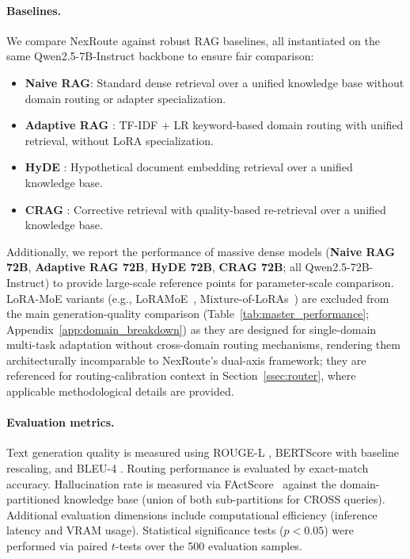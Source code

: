 \documentclass[a4paper,fleql]{cas-sc}
\begin{document}
\paragraph{Baselines.}
We compare NexRoute against robust RAG baselines, all instantiated on the same
Qwen2.5-7B-Instruct backbone to ensure fair comparison:
\begin{itemize}
    \item \textbf{Naive RAG}: Standard dense retrieval over a unified knowledge
    base without domain routing or adapter specialization.

    \item \textbf{Adaptive RAG} \citep{jeong2024adaptiverag}: TF-IDF + LR
    keyword-based domain routing with unified retrieval, without LoRA
    specialization.

    \item \textbf{HyDE} \citep{gao2023hyde}: Hypothetical document embedding
    retrieval over a unified knowledge base.

    \item \textbf{CRAG} \citep{yan2024crag}: Corrective retrieval with
    quality-based re-retrieval over a unified knowledge base.
\end{itemize}
Additionally, we report the performance of massive dense models
(\textbf{Naive RAG 72B}, \textbf{Adaptive RAG 72B}, \textbf{HyDE 72B},
\textbf{CRAG 72B}; all Qwen2.5-72B-Instruct) to provide large-scale
reference points for parameter-scale comparison. LoRA-MoE variants
(e.g., LoRAMoE~\citep{dou2024loramoe}, Mixture-of-LoRAs~\citep{wu2024mixtureofloras})
are excluded from the main generation-quality comparison
(Table~\ref{tab:master_performance}; Appendix~\ref{app:domain_breakdown}) as they are
designed for single-domain multi-task adaptation without cross-domain routing
mechanisms, rendering them architecturally incomparable to NexRoute's dual-axis
framework; they are referenced for routing-calibration context in
Section~\ref{ssec:router}, where applicable methodological details are provided.

\paragraph{Evaluation metrics.}
Text generation quality is measured using ROUGE-L \citep{lin2004rouge},
BERTScore \citep{zhang2020bertscore} with baseline rescaling, and BLEU-4
\citep{papineni2002bleu}. Routing performance is evaluated by exact-match
accuracy. Hallucination rate is measured via FActScore~\citep{min2023factscore} against the domain-partitioned knowledge base (union of both sub-partitions for CROSS queries).
Additional evaluation dimensions include computational efficiency (inference
latency and VRAM usage). Statistical
significance tests ($p < 0.05$) were performed via paired $t$-tests over the
500 evaluation samples.
\end{document}
